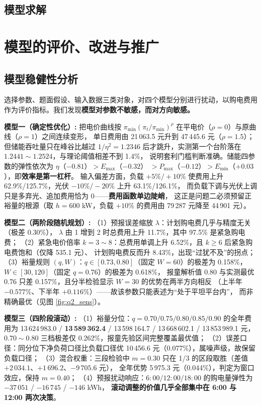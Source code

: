 \documentclass{cumcmthesis}
\begin{document}
        \subsection{模型求解}
        \section{模型的评价、改进与推广}
    \subsection{模型稳健性分析}

    选择参数、题面假设、输入数据三类对象，对四个模型分别进行扰动，以购电费用作为评价指标。我们发现\textbf{模型对参数不敏感，而对方向敏感。}

    \noindent\textbf{模型一（确定性优化）:}
    把电价曲线按 $\pi_{\min}(\pi_t/\pi_{\min})^{\rho}$ 在平电价（$\rho=0$）与原曲线（$\rho=1$）之间连续变形，
    单日费用由 21\,063.5 元升到 47\,445.6 元（$\rho=1.5$）；但储能吞吐量只在峰谷比越过
    $1/\eta^{2}=1.2346$ 后才跳升，实测第一个台阶落在 $1.2441\sim1.2524$，与理论阈值相差不到 1.4\%，
    说明套利门槛判断准确。储能四参数的弹性依次为 $\eta$（$-0.81$）$>E_{\max}$（$-0.32$）
    $>P_{\max}$（$-0.12$）$>E_{\min}$（$+0.03$），即\textbf{效率是第一杠杆}。
    输入偏差方面，负载 $+5\%/+10\%$ 使费用上升 62.9\%/125.7\%，光伏 $-10\%/-20\%$ 上升 63.1\%/126.1\%，
    而负载下调与光伏上调只是多弃光、追加费用恰为 0——\textbf{费用函数单边陡峭}，
    这正是问题二必须预留正裕量的根源（取 $h=600$ kW，负载 $+10\%$ 的费用由 79\,287 元降至 44\,901 元）。

    \noindent\textbf{模型二（两阶段随机规划）:}
    （1）预报误差缩放 $\lambda$：计划购电费几乎与精度无关（极差 0.30\%），
    $\lambda$ 由 1 增到 2 时总费用上升 11.7\%，其中 97.5\% 是紧急购电费；
    （2）紧急电价倍率 $k=3\sim8$：总费用单调上升 6.52\%，且 $k\ge6$ 后紧急购电费饱和（仅降 535.1 元）、
    计划购电费反而升 8.43\%，出现“过犹不及”的拐点；
    （3）裕量规则 $(q,W)$：$q\in[0.73,0.80]$（固定 $W=60$）的极差为 0.158\%，
    $W\in[30,120]$（固定 $q=0.76$）的极差为 0.618\%，
    报童解析值 0.80 与实测最优 0.76 只差 0.157\%，且分半检验显示 $W=30$ 的优势在两半方向相反
    （上半年 $-0.577\%$、下半年 $+0.116\%$）——故该参数只能表述为“处于平坦平台内”，
    而非精确最优（见图 \ref{fig:q2_sens}）。

    \noindent\textbf{模型三（四阶段滚动）:}
    （1）裕量分位：$q=0.70/0.75/0.80/0.85/0.90$ 的全年费用为
    13\,624\,983.0 / \textbf{13\,589\,362.4} / 13\,598\,164.7 / 13\,668\,602.1 / 13\,853\,989.1 元，
    $0.70\sim0.80$ 三档极差仅 0.262\%，报童先验区间完整覆盖最优值；
    （2）误差口径：同分位下净负荷口径比负载口径优 10\,456.6 元（0.077\%），属噪声级，故保留负载口径；
    （3）混合权重：三段检验中 $m=0.30$ 只在 1/3 的区段取胜（差值 $+2\,034.1$、$+1\,696.2$、$-9\,705.6$ 元），
    全年优势 5\,975.3 元（0.044\%），判定为窗口效应，保持 $m=0.40$；
    （4）预报扰动响应：$6{:}00/12{:}00/18{:}00$ 的购电量弹性为 $-37\,051$ / $-16\,745$ / $-146$ kWh，
    \textbf{滚动调整的价值几乎全部集中在 6:00 与 12:00 两次决策}。
\end{document}
